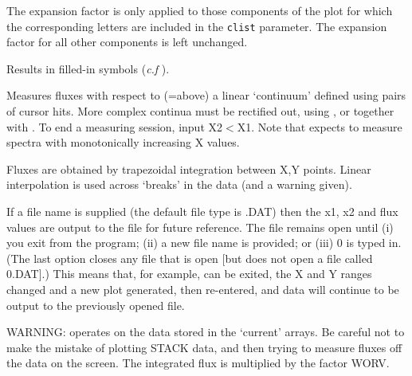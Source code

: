 \begin {description}
\begin{dipdesc}
\end{dipdesc}

The expansion factor is only applied to those components of the plot for which
the corresponding letters are included in the {\tt{clist}}  parameter. The
expansion factor for all other components is left unchanged.

Results in filled-in   symbols ({\it c.f} ). 

Measures fluxes with respect to (=above) a linear `continuum' defined
using pairs of cursor hits. More complex continua must be rectified
out, using ,  or   together with .  To end a   measuring
session, input X2$<$X1. Note that   expects to measure spectra with
monotonically increasing X values.

Fluxes are obtained by trapezoidal integration between X,Y points.
Linear interpolation is used across `breaks' in the data (and a
warning given).

If a file name is supplied (the default file type is .DAT) then the
x1, x2 and flux values are output to the file for future reference.
The file remains open until (i) you exit from the program; (ii) a new
file name is provided; or (iii)   0 is typed in. (The last option
closes any file that is open [but does not open a file called 0.DAT].)
This means that, for example,   can be exited, the X and Y ranges
changed and a new plot generated, then   re-entered, and data will
continue to be output to the previously opened file.

WARNING:   operates on the data stored in the `current' arrays. Be
careful not to make the mistake of plotting STACK data, and then
trying to measure fluxes off the data on the screen. The integrated
flux is multiplied by the factor WORV.


\end{description}
